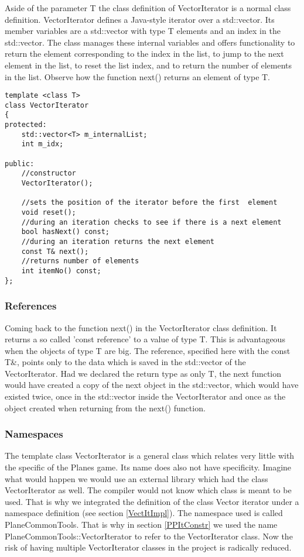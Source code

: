 Aside of the parameter T the class definition of VectorIterator is a normal class definition. VectorIterator defines a Java-style iterator over a std::vector. Its member variables are a std::vector with type T elements and an index in the std::vector. The class manages these internal variables and offers functionality to return the element corresponding to the index in the list, to jump to the next element in the list, to reset the list index, and to return the number of elements in the list. Observe how the function next() returns an element of type T.

\begin{lstlisting}
template <class T>
class VectorIterator
{
protected:
    std::vector<T> m_internalList;
    int m_idx;

public:
    //constructor
    VectorIterator();

    //sets the position of the iterator before the first  element
    void reset();
    //during an iteration checks to see if there is a next element
    bool hasNext() const;
    //during an iteration returns the next element
    const T& next();
    //returns number of elements
    int itemNo() const;
};

\end{lstlisting}

\subsubsection {References}

Coming back to the function next() in the VectorIterator class definition. It returns a so called 'const reference' to a value of type T. This is advantageous when the objects of type T are big. The reference, specified here with the const T\&, points only to the data which is saved in the std::vector of the VectorIterator. Had we declared the return type as only T, the next function would have created a copy of the next object in the std::vector, which would have existed twice, once in the std::vector inside the VectorIterator and once as the object created when returning from the next() function.

\subsubsection {Namespaces}

The template class VectorIterator is a general class which relates very little with the specific of the Planes game. Its name does also not have specificity. Imagine what would happen we would use an external library which had the class VectorIterator as well. The compiler would not know which class is meant to be used. That is why we integrated the definition of the class Vector iterator under a namespace definition (see section \ref{VectItImpl}). The namespace used is called PlaneCommonTools. That is why in section \ref{PPItConstr} we used the name PlaneCommonTools::VectorIterator to refer to the VectorIterator class. Now the risk of having multiple VectorIterator classes in the project is radically reduced. 


